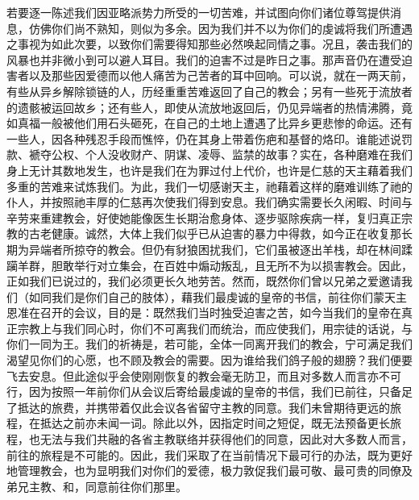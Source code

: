 若要逐一陈述我们因亚略派势力所受的一切苦难，并试图向你们诸位尊驾提供消息，仿佛你们尚不熟知，则似为多余。因为我们并不以为你们的虔诚将我们所遭遇之事视为如此次要，以致你们需要得知那些必然唤起同情之事。况且，袭击我们的风暴也并非微小到可以避人耳目。我们的迫害不过是昨日之事。那声音仍在遭受迫害者以及那些因爱德而以他人痛苦为己苦者的耳中回响。可以说，就在一两天前，有些从异乡解除锁链的人，历经重重苦难返回了自己的教会；另有一些死于流放者的遗骸被运回故乡；还有些人，即使从流放地返回后，仍见异端者的热情沸腾，竟如真福一般被他们用石头砸死，在自己的土地上遭遇了比异乡更悲惨的命运。还有一些人，因各种残忍手段而憔悴，仍在其身上带着伤疤和基督的烙印。谁能述说罚款、褫夺公权、个人没收财产、阴谋、凌辱、监禁的故事？实在，各种磨难在我们身上无计其数地发生，也许是我们在为罪过付上代价，也许是仁慈的天主藉着我们多重的苦难来试炼我们。为此，我们一切感谢天主，祂藉着这样的磨难训练了祂的仆人，并按照祂丰厚的仁慈再次使我们得到安息。我们确实需要长久闲暇、时间与辛劳来重建教会，好使她能像医生长期治愈身体、逐步驱除疾病一样，复归真正宗教的古老健康。诚然，大体上我们似乎已从迫害的暴力中得救，如今正在收复那长期为异端者所掠夺的教会。但仍有豺狼困扰我们，它们虽被逐出羊栈，却在林间蹂躏羊群，胆敢举行对立集会，在百姓中煽动叛乱，且无所不为以损害教会。因此，正如我们已说过的，我们必须更长久地劳苦。然而，既然你们曾以兄弟之爱邀请我们（如同我们是你们自己的肢体），藉我们最虔诚的皇帝的书信，前往你们蒙天主恩准在召开的会议，目的是：既然我们当时独受迫害之苦，如今当我们的皇帝在真正宗教上与我们同心时，你们不可离我们而统治，而应使我们，用宗徒的话说，与你们一同为王。我们的祈祷是，若可能，全体一同离开我们的教会，宁可满足我们渴望见你们的心愿，也不顾及教会的需要。因为谁给我们鸽子般的翅膀？我们便要飞去安息。但此途似乎会使刚刚恢复的教会毫无防卫，而且对多数人而言亦不可行，因为按照一年前你们从会议后寄给最虔诚的皇帝的书信，我们已前往，只备足了抵达的旅费，并携带着仅此会议各省留守主教的同意。我们未曾期待更远的旅程，在抵达之前亦未闻一词。除此以外，因指定时间之短促，既无法预备更长旅程，也无法与我们共融的各省主教联络并获得他们的同意，因此对大多数人而言，前往的旅程是不可能的。因此，我们采取了在当前情况下最可行的办法，既为更好地管理教会，也为显明我们对你们的爱德，极力敦促我们最可敬、最可贵的同僚及弟兄主教、和，同意前往你们那里。\par

